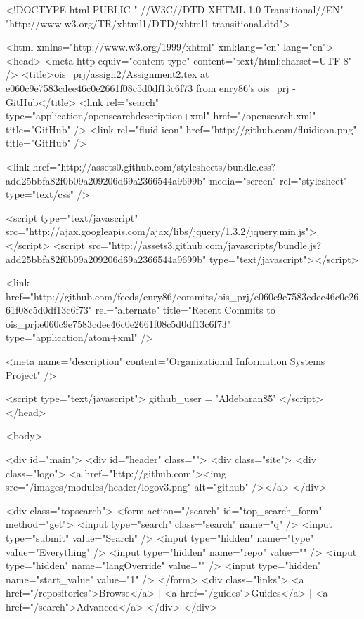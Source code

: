 



<!DOCTYPE html PUBLIC "-//W3C//DTD XHTML 1.0 Transitional//EN"
  "http://www.w3.org/TR/xhtml1/DTD/xhtml1-transitional.dtd">

<html xmlns="http://www.w3.org/1999/xhtml" xml:lang="en" lang="en">
  <head>
    <meta http-equiv="content-type" content="text/html;charset=UTF-8" />
        <title>ois_prj/assign2/Assignment2.tex at e060c9e7583cdee46c0e2661f08c5d0df13c6f73 from enry86's ois_prj - GitHub</title>
    <link rel="search" type="application/opensearchdescription+xml" href="/opensearch.xml" title="GitHub" />
    <link rel="fluid-icon" href="http://github.com/fluidicon.png" title="GitHub" />

    
      <link href="http://assets0.github.com/stylesheets/bundle.css?add25bbfa82f0b09a209206d69a2366544a9699b" media="screen" rel="stylesheet" type="text/css" />
    

    
      
        <script type="text/javascript" src="http://ajax.googleapis.com/ajax/libs/jquery/1.3.2/jquery.min.js"></script>
        <script src="http://assets3.github.com/javascripts/bundle.js?add25bbfa82f0b09a209206d69a2366544a9699b" type="text/javascript"></script>
      
    
    
  
    
  

  <link href="http://github.com/feeds/enry86/commits/ois_prj/e060c9e7583cdee46c0e2661f08c5d0df13c6f73" rel="alternate" title="Recent Commits to ois_prj:e060c9e7583cdee46c0e2661f08c5d0df13c6f73" type="application/atom+xml" />

  <meta name="description" content="Organizational Information Systems Project" />


    

    <script type="text/javascript">
      github_user = 'Aldebaran85'
    </script>
  </head>

  

  <body>
    

    <div id="main">
      <div id="header" class="">
        <div class="site">
          <div class="logo">
            <a href="http://github.com"><img src="/images/modules/header/logov3.png" alt="github" /></a>
          </div>
          
            <div class="topsearch">
  <form action="/search" id="top_search_form" method="get">
    <input type="search" class="search" name="q" /> <input type="submit" value="Search" />
    <input type="hidden" name="type" value="Everything" />
    <input type="hidden" name="repo" value="" />
    <input type="hidden" name="langOverride" value="" />
    <input type="hidden" name="start_value" value="1" />
  </form>
  <div class="links">
    <a href="/repositories">Browse</a> | <a href="/guides">Guides</a> | <a href="/search">Advanced</a>
  </div>
</div>
          
